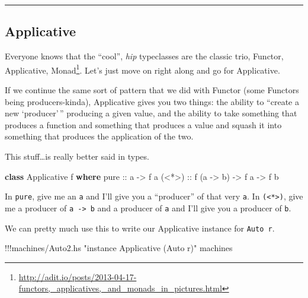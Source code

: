 \documentclass[]{article}
\newenvironment{Shaded}{}{}
\newcommand{\KeywordTok}[1]{\textcolor[rgb]{0.00,0.44,0.13}{\textbf{{#1}}}}
\newcommand{\DataTypeTok}[1]{\textcolor[rgb]{0.56,0.13,0.00}{{#1}}}
\newcommand{\StringTok}[1]{\textcolor[rgb]{0.25,0.44,0.63}{{#1}}}
\newcommand{\OtherTok}[1]{\textcolor[rgb]{0.00,0.44,0.13}{{#1}}}
\newcommand{\FunctionTok}[1]{\textcolor[rgb]{0.02,0.16,0.49}{{#1}}}
\newcommand{\NormalTok}[1]{{#1}}
\renewcommand{\href}[2]{#2\footnote{\url{#1}}}
\begin{document}
\begin{center}\rule{0.5\linewidth}{\linethickness}\end{center}

\subsection{Applicative}\label{applicative}

Everyone knows that the ``cool'', \emph{hip} typeclasses are the classic
trio,
\href{http://adit.io/posts/2013-04-17-functors,_applicatives,_and_monads_in_pictures.html}{Functor,
Applicative, Monad}. Let's just move on right along and go for
Applicative.

If we continue the same sort of pattern that we did with Functor (some
Functors being producers-kinda), Applicative gives you two things: the
ability to ``create a new `producer'\,'' producing a given value, and
the ability to take something that produces a function and something
that produces a value and squash it into something that produces the
application of the two.

This stuff\ldots{}is really better said in types.

\begin{Shaded}
\begin{Highlighting}[]
\KeywordTok{class} \DataTypeTok{Applicative} \NormalTok{f }\KeywordTok{where}
\OtherTok{    pure  ::} \NormalTok{a }\OtherTok{->} \NormalTok{f a}
\OtherTok{    (<*>) ::} \NormalTok{f (a }\OtherTok{->} \NormalTok{b) }\OtherTok{->} \NormalTok{f a }\OtherTok{->} \NormalTok{f b}
\end{Highlighting}
\end{Shaded}

In \texttt{pure}, give me an \texttt{a} and I'll give you a ``producer''
of that very \texttt{a}. In \texttt{(\textless{}*\textgreater{})}, give
me a producer of \texttt{a\ -\textgreater{}\ b} and a producer of
\texttt{a} and I'll give you a producer of \texttt{b}.

We can pretty much use this to write our Applicative instance for
\texttt{Auto\ r}.

\begin{Shaded}
\begin{Highlighting}[]
\FunctionTok{!!!}\NormalTok{machines}\FunctionTok{/}\NormalTok{Auto2.hs }\StringTok{"instance Applicative (Auto r)"} \NormalTok{machines}
\end{Highlighting}
\end{Shaded}
\end{document}
